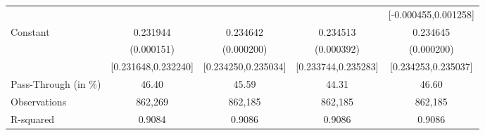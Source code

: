 {\begin{tabular}{l*{4}{c}}
                    &                     &                     &                     &[-0.000455,0.001258]         \\
Constant            &    0.231944\sym{***}&    0.234642\sym{***}&    0.234513\sym{***}&    0.234645\sym{***}\\
                    &  (0.000151)         &  (0.000200)         &  (0.000392)         &  (0.000200)         \\
                    &[0.231648,0.232240]         &[0.234250,0.235034]         &[0.233744,0.235283]         &[0.234253,0.235037]         \\
\midrule
Pass-Through (in \%)&       46.40         &       45.59         &       44.31         &       46.60         \\
Observations        &     862,269         &     862,185         &     862,185         &     862,185         \\
R-squared           &      0.9084         &      0.9086         &      0.9086         &      0.9086         \\
\bottomrule
\end{tabular}
}
